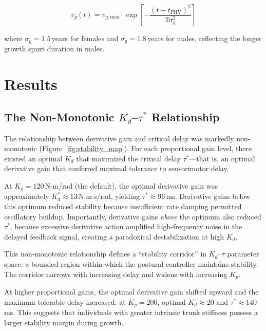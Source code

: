 \documentclass[12pt,a4paper]{article}
\begin{document}
\begin{equation}
v_g(t) = v_{g,\text{max}} \cdot \exp\left[-\frac{(t - t_{\text{PHV}})^2}{2\sigma_g^2}\right]
\label{eq:growth}
\end{equation}

\noindent where $\sigma_g = 1.5$\,years for females and $\sigma_g = 1.8$\,years for males, reflecting the longer growth spurt duration in males.

\section{Results}

\subsection{The Non-Monotonic $K_d$--$\tau^*$ Relationship}

The relationship between derivative gain and critical delay was markedly non-monotonic (Figure~\ref{fig:stability_map}). For each proportional gain level, there existed an optimal $K_d$ that maximized the critical delay $\tau^*$---that is, an optimal derivative gain that conferred maximal tolerance to sensorimotor delay.

At $K_p = 120$\,N$\cdot$m/rad (the default), the optimal derivative gain was approximately $K_d^* \approx 13$\,N$\cdot$m$\cdot$s/rad, yielding $\tau^* \approx 96$\,ms. Derivative gains below this optimum reduced stability because insufficient rate damping permitted oscillatory buildup. Importantly, derivative gains \textit{above} the optimum also reduced $\tau^*$, because excessive derivative action amplified high-frequency noise in the delayed feedback signal, creating a paradoxical destabilization at high $K_d$.

This non-monotonic relationship defines a ``stability corridor'' in $K_d$--$\tau$ parameter space: a bounded region within which the postural controller maintains stability. The corridor narrows with increasing delay and widens with increasing $K_p$.

At higher proportional gains, the optimal derivative gain shifted upward and the maximum tolerable delay increased: at $K_p = 200$, optimal $K_d \approx 20$ and $\tau^* \approx 140$\,ms. This suggests that individuals with greater intrinsic trunk stiffness possess a larger stability margin during growth.
\end{document}
